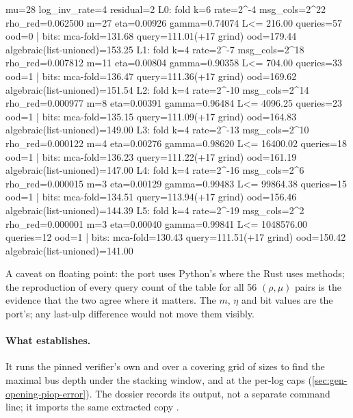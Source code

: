 \begin{shellcode}
mu=28 log_inv_rate=4 residual=2
  L0: fold k=6 rate=2^-4 msg_cols=2^22 rho_red=0.062500 m=27 eta=0.00926 gamma=0.74074 L<= 216.00 queries=57 ood=0 | bits: mca-fold=131.68 query=111.01(+17 grind) ood=179.44 algebraic(list-unioned)=153.25
  L1: fold k=4 rate=2^-7 msg_cols=2^18 rho_red=0.007812 m=11 eta=0.00804 gamma=0.90358 L<= 704.00 queries=33 ood=1 | bits: mca-fold=136.47 query=111.36(+17 grind) ood=169.62 algebraic(list-unioned)=151.54
  L2: fold k=4 rate=2^-10 msg_cols=2^14 rho_red=0.000977 m=8 eta=0.00391 gamma=0.96484 L<= 4096.25 queries=23 ood=1 | bits: mca-fold=135.15 query=111.09(+17 grind) ood=164.83 algebraic(list-unioned)=149.00
  L3: fold k=4 rate=2^-13 msg_cols=2^10 rho_red=0.000122 m=4 eta=0.00276 gamma=0.98620 L<= 16400.02 queries=18 ood=1 | bits: mca-fold=136.23 query=111.22(+17 grind) ood=161.19 algebraic(list-unioned)=147.00
  L4: fold k=4 rate=2^-16 msg_cols=2^6 rho_red=0.000015 m=3 eta=0.00129 gamma=0.99483 L<= 99864.38 queries=15 ood=1 | bits: mca-fold=134.51 query=113.94(+17 grind) ood=156.46 algebraic(list-unioned)=144.39
  L5: fold k=4 rate=2^-19 msg_cols=2^2 rho_red=0.000001 m=3 eta=0.00040 gamma=0.99841 L<= 1048576.00 queries=12 ood=1 | bits: mca-fold=130.43 query=111.51(+17 grind) ood=150.42 algebraic(list-unioned)=141.00
\end{shellcode}

A caveat on floating point: the port uses Python's  where the Rust uses 
methods; the reproduction of every query count of the table for all 56 $(ρ, μ)$ pairs is the evidence
that the two agree where it matters. The $m$, $η$ and bit values are the port's; any last-ulp
difference would not move them visibly.

\paragraph{What  establishes.} It runs the pinned verifier's own
 and  over a covering grid of sizes to find the maximal bus depth
under the stacking window, and at the per-log caps (\cref{sec:gen-opening-piop-error}). The dossier
records its output, not a separate command line; it imports the same extracted copy
.

